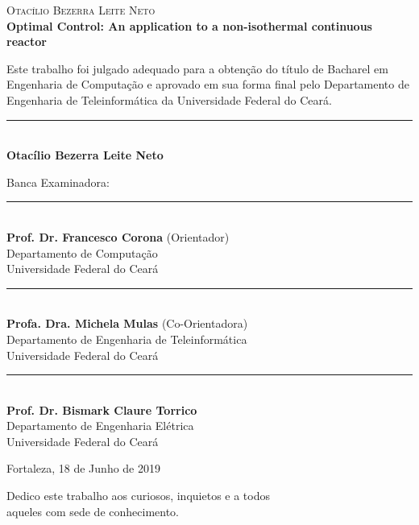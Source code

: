 \documentclass[a4paper,11pt]{book}
\numberwithin{figure}{chapter}
\numberwithin{equation}{chapter}
\numberwithin{table}{chapter}
\theoremstyle{definition}
\newlength{\signwidth}
\newlength{\signthickness}
\newlength{\signskip}
\newcommand{\sign}[1]{%
  \parbox{\signwidth}{\vspace*{\signskip}\centering%
  \rule{\signwidth}{\signthickness}\\%
  \nopagebreak #1\par}%
}
\newcommand{\csign}[1]%
  {\begingroup\par\centering\sign{#1}\par\endgroup}
\begin{document}
\clearpage
\thispagestyle{empty}%
\begin{center}
    \textsc{Otacílio Bezerra Leite Neto}\\
     \vspace{1.5cm} \textbf{Optimal Control: An application to a non-isothermal continuous reactor}     \\
\end{center}

   \vspace{1.0cm}
    Este trabalho foi julgado adequado para a obtenção do título de Bacharel em Engenharia de Computação e aprovado em sua forma final pelo Departamento de Engenharia de Teleinformática da Universidade Federal do Ceará.
    \csign{\textbf{Otacílio Bezerra Leite Neto}}
     \vspace{1.0cm}
     \noindent Banca Examinadora:
     \csign{\textbf{Prof. Dr. Francesco Corona} (Orientador)\\Departamento de Computação\\Universidade Federal do Ceará}
     \csign{\textbf{Profa. Dra. Michela Mulas} (Co-Orientadora)\\Departamento de Engenharia de Teleinformática\\Universidade Federal do Ceará}
     \csign{\textbf{Prof. Dr. Bismark Claure Torrico}\\Departamento de Engenharia Elétrica\\Universidade Federal do Ceará}
     \vspace{0.75cm}%

\begin{center}
    {\normalsize    Fortaleza, 18 de Junho de 2019}
\end{center}

\clearpage
\thispagestyle{empty}%
\null\vfill
\begin{flushright}
Dedico este trabalho aos curiosos, inquietos e a todos\\aqueles com sede de conhecimento.
\end{flushright}
\end{document}
